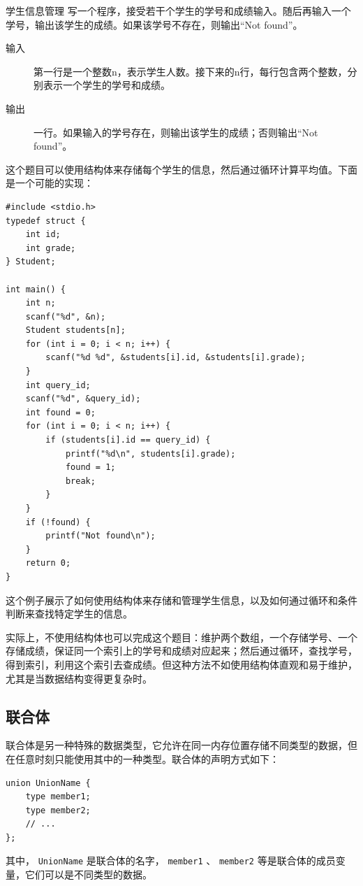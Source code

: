 \begin{example}{学生信息管理}{}
  写一个程序，接受若干个学生的学号和成绩输入。随后再输入一个学号，输出该学生的成绩。如果该学号不存在，则输出“Not found”。
    \begin{description}
        \item[输入] 第一行是一个整数n，表示学生人数。接下来的n行，每行包含两个整数，分别表示一个学生的学号和成绩。
        \item[输出] 一行。如果输入的学号存在，则输出该学生的成绩；否则输出“Not found”。
    \end{description}
    \tcblower
    这个题目可以使用结构体来存储每个学生的信息，然后通过循环计算平均值。下面是一个可能的实现：
    \begin{verbatim}
#include <stdio.h>
typedef struct {
    int id;
    int grade;
} Student;

int main() {
    int n;
    scanf("%d", &n);
    Student students[n];
    for (int i = 0; i < n; i++) {
        scanf("%d %d", &students[i].id, &students[i].grade);
    }
    int query_id;
    scanf("%d", &query_id);
    int found = 0;
    for (int i = 0; i < n; i++) {
        if (students[i].id == query_id) {
            printf("%d\n", students[i].grade);
            found = 1;
            break;
        }
    }
    if (!found) {
        printf("Not found\n");
    }
    return 0;
}
    \end{verbatim}

    这个例子展示了如何使用结构体来存储和管理学生信息，以及如何通过循环和条件判断来查找特定学生的信息。

    实际上，不使用结构体也可以完成这个题目：维护两个数组，一个存储学号、一个存储成绩，保证同一个索引上的学号和成绩对应起来；然后通过循环，查找学号，得到索引，利用这个索引去查成绩。但这种方法不如使用结构体直观和易于维护，尤其是当数据结构变得更复杂时。
\end{example}

\subsection{联合体}

联合体是另一种特殊的数据类型，它允许在同一内存位置存储不同类型的数据，但在任意时刻只能使用其中的一种类型。联合体的声明方式如下：
\begin{verbatim}
union UnionName {
    type member1;
    type member2;
    // ...
};
\end{verbatim}
其中， \verb|UnionName| 是联合体的名字， \verb|member1| 、 \verb|member2| 等是联合体的成员变量，它们可以是不同类型的数据。

